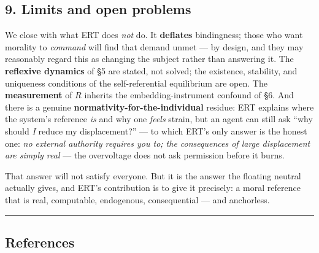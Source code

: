 \documentclass[
]{article}
\begin{document}
\subsection{9. Limits and open problems}\label{limits-and-open-problems}

We close with what ERT does \emph{not} do. It \textbf{deflates}
bindingness; those who want morality to \emph{command} will find that
demand unmet --- by design, and they may reasonably regard this as
changing the subject rather than answering it. The \textbf{reflexive
dynamics} of §5 are stated, not solved; the existence, stability, and
uniqueness conditions of the self-referential equilibrium are open. The
\textbf{measurement} of \(R\) inherits the embedding-instrument confound
of §6. And there is a genuine \textbf{normativity-for-the-individual}
residue: ERT explains where the system's reference \emph{is} and why one
\emph{feels} strain, but an agent can still ask ``why should \emph{I}
reduce my displacement?'' --- to which ERT's only answer is the honest
one: \emph{no external authority requires you to; the consequences of
large displacement are simply real} --- the overvoltage does not ask
permission before it burns.

That answer will not satisfy everyone. But it is the answer the floating
neutral actually gives, and ERT's contribution is to give it precisely:
a moral reference that is real, computable, endogenous, consequential
--- and anchorless.

\begin{center}\rule{0.5\linewidth}{0.5pt}\end{center}

\subsection{References}\label{references}
\end{document}
